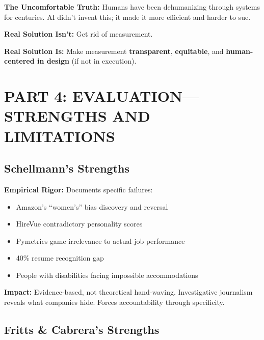 \documentclass[12pt,letterpaper]{article}
\begin{document}
\textbf{The Uncomfortable Truth:} Humans have been dehumanizing through systems for centuries. AI didn't invent this; it made it more efficient and harder to sue.

\begin{puzzleplan}
\textbf{Real Solution Isn't:} Get rid of measurement.

\textbf{Real Solution Is:} Make measurement \textbf{transparent}, \textbf{equitable}, and \textbf{human-centered in design} (if not in execution).
\end{puzzleplan}

\newpage

\section{PART 4: EVALUATION---STRENGTHS AND LIMITATIONS}

\subsection{Schellmann's Strengths}

\begin{keyfindings}
\textbf{Empirical Rigor:} Documents specific failures:
\begin{itemize}[leftmargin=*,noitemsep,font=\small]
    \item Amazon's ``women's'' bias discovery and reversal
    \item HireVue contradictory personality scores
    \item Pymetrics game irrelevance to actual job performance
    \item 40\% resume recognition gap
    \item People with disabilities facing impossible accommodations
\end{itemize}

\textbf{Impact:} Evidence-based, not theoretical hand-waving. Investigative journalism reveals what companies hide. Forces accountability through specificity.
\end{keyfindings}

\subsection{Fritts \& Cabrera's Strengths}
\end{document}
